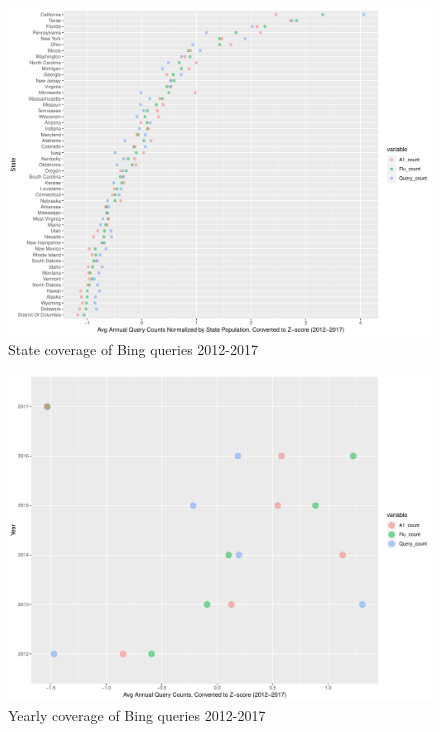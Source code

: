 \documentclass[12pt]{article}
\begin{document}
\begin{figure}[!htbp]
\begin{centering}
   \includegraphics[width=1\textwidth]{state_coverage.pdf}
  \caption{State coverage of Bing queries 2012-2017}
\label{state_coverage}
\end{centering}
\end{figure}

\begin{figure}[!htbp]
\begin{centering}
   \includegraphics[width=1\textwidth]{yearly_coverage.pdf}
  \caption{Yearly coverage of Bing queries 2012-2017}
\label{year_coverage}
\end{centering}
\end{figure}
\end{document}
